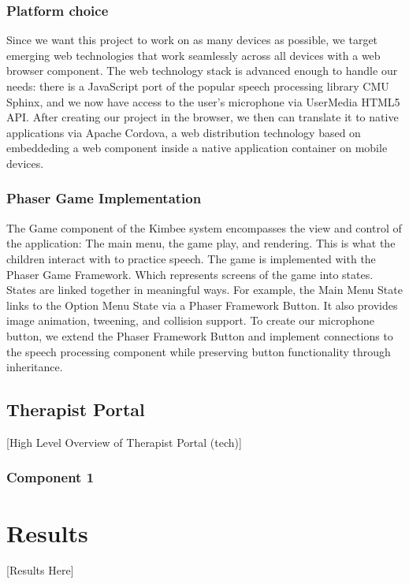 \documentclass{sig-alternate-2013}
\begin{document}
\subsubsection{Platform choice}
Since we want this project to work on as many devices as possible, we target emerging web technologies that work seamlessly across all devices with a web browser component. The web technology stack is advanced enough to handle our needs: there is a JavaScript port of the popular speech processing library CMU Sphinx, and we now have access to the user's microphone via UserMedia HTML5 API. After creating our project in the browser, we then can translate it to native applications via Apache Cordova, a web distribution technology based on embeddeding a web component inside a native application container on mobile devices.

\subsubsection{Phaser Game Implementation}
The Game component of the Kimbee system encompasses the view and control of the application: The main menu, the game play, and rendering. This is what the children interact with to practice speech. The game is implemented with the Phaser Game Framework. Which represents screens of the game into states. States are linked together in meaningful ways. For example, the Main Menu State links to the Option Menu State via a Phaser Framework Button. It also provides image animation, tweening, and collision support. To create our microphone button, we extend the Phaser Framework Button and implement connections to the speech processing component while preserving button functionality through inheritance.

\subsection{Therapist Portal}

[High Level Overview of Therapist Portal (tech)]

\subsubsection{Component 1}


\section{Results}

[Results Here]
\end{document}
